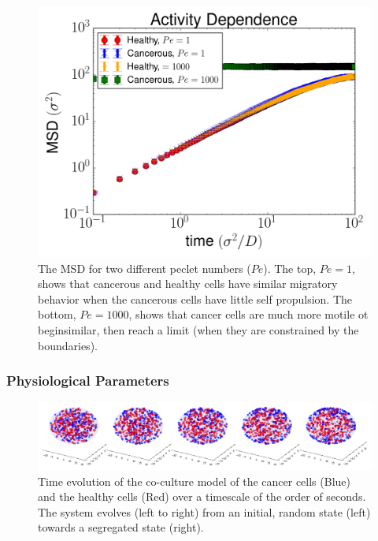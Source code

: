 \documentclass[aps,prb,twocolumn,groupedaddress,nofootinbib,floatfix]{revtex4}
\begin{document}
\begin{figure}
    \includegraphics[width=1.0\columnwidth]{images/pe_both.png}
  \caption{The MSD for two different peclet numbers ($Pe$). The top, $Pe=1$, shows that cancerous and healthy cells have similar migratory behavior when the cancerous cells have little self propulsion. The bottom, $Pe=1000$, shows that cancer cells are much more motile ot beginsimilar, then reach a limit (when they are constrained by the boundaries).}
  \label{fig:prop}
\end{figure}



\subsubsection{Physiological Parameters}

\begin{figure}
  \centering
  \includegraphics[width=\textwidth]{images/separation.png}
  \caption[separation]{Time evolution of the co-culture model of the cancer cells (Blue) and the healthy cells (Red) over a timescale of the order of seconds. The system evolves (left to right) from an initial, random state (left) towards a segregated state (right).}
   \label{fig:separation}
\end{figure}
\end{document}
